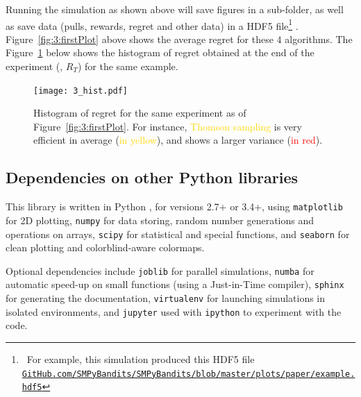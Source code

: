 Running the simulation as shown above will save figures in a sub-folder, as well as save data (pulls, rewards, regret and other data) in a HDF5 file\footnote{~For example, this simulation produced this HDF5 file\\\texttt{\href{https://github.com/SMPyBandits/SMPyBandits/blob/master/plots/paper/example.hdf5}{GitHub.com/SMPyBandits/SMPyBandits/blob/master/plots/paper/example.hdf5}}}
\cite{h5py}.
Figure~\ref{fig:3:firstPlot} above shows the average regret for these $4$ algorithms.
The Figure~\ref{fig:3:firstPlot_hist} below shows the histogram of regret obtained at the end of the experiment (\ie, $R_T$) for the same example.

\begin{figure}[h!]  %
	\centering
	\texttt{[image: 3\_hist.pdf]}
	\caption{Histogram of regret for the same experiment as of Figure~\ref{fig:3:firstPlot}. For instance, \textcolor{gold}{Thomson sampling} is very efficient in average (\textcolor{gold}{in yellow}), and \textcolor{red}{\UCB} shows a larger variance (\textcolor{red}{in red}).}
	\label{fig:3:firstPlot_hist}
\end{figure}


\subsection{Dependencies on other Python libraries}
\label{sub:3:dependencies}

This library is written in Python \cite{python}, for versions 2.7+ or 3.4+, using \texttt{matplotlib} \cite{matplotlib} for 2D plotting, \texttt{numpy} \cite{numpy} for data storing, random number generations and operations on arrays, \texttt{scipy} \cite{scipy} for statistical and special functions, and \texttt{seaborn} \cite{seaborn} for clean plotting and colorblind-aware colormaps.

Optional dependencies include \texttt{joblib} \cite{joblib} for parallel simulations, \texttt{numba} \cite{numba} for automatic speed-up on small functions (using a Just-in-Time compiler), \texttt{sphinx} \cite{sphinx} for generating the documentation, \texttt{virtualenv} \cite{virtualenv} for launching simulations in isolated environments, and \texttt{jupyter} \cite{jupyter} used with \texttt{ipython} \cite{ipython} to experiment with the code.

